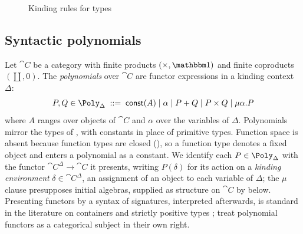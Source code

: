 \begin{figure}
\caption{Kinding rules for types}
\label{fig:polynomial-types:kinding}
\end{figure}

\subsection{Syntactic polynomials}
\label{sec:polynomial-types:poly}

Let $\cat{C}$ be a category with finite products $(\times, \One)$ and finite coproducts
$(\coprod, 0)$. The \emph{polynomials} over $\cat{C}$ are functor expressions in a kinding context
$\Delta$:
\[
  P, Q \in \Poly_\Delta \;::=\; \const(A) \mid \alpha \mid P + Q \mid P \times Q \mid \mu\alpha.P
\]
where $A$ ranges over objects of $\cat{C}$ and $\alpha$ over the variables of $\Delta$.
Polynomials mirror the types of , with constants in place of primitive
types. Function space is absent because function types are closed (),
so a function type denotes a fixed object and enters a polynomial as a constant. We identify each $P
\in \Poly_\Delta$ with the functor $\cat{C}^\Delta \to \cat{C}$ it presents, writing $P(\delta)$ for
its action on a \emph{kinding environment} $\delta \in \cat{C}^\Delta$, an assignment of an object to
each variable of $\Delta$; the $\mu$ clause presupposes initial algebras, supplied as structure on
$\cat{C}$ by  below. Presenting functors by a syntax of signatures,
interpreted afterwards, is standard in the literature on containers and strictly positive types
\citep{abbott2005}; \citet{gambino-kock} treat polynomial functors as a categorical subject in their
own right.

